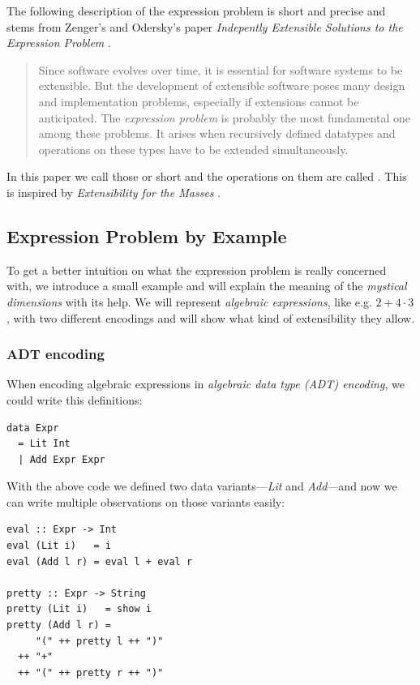 The following description of the expression problem is short and precise and
stems from Zenger’s and Odersky’s paper \emph{Indepently Extensible Solutions to
  the Expression Problem} \cite{indie_solutions}.

\begin{quote}
  Since software evolves over time, it is essential for software systems to be
  extensible. But the development of extensible software poses many design and
  implementation problems, especially if extensions cannot be anticipated. The
  \emph{expression problem} is probably the most fundamental one among these
  problems. It arises when recursively defined datatypes and operations on
  these types have to be extended simultaneously.
\end{quote}

In this paper we call those   or short
 and the operations on them are called . This is
inspired by \emph{Extensibility for the Masses} \cite{object_algebra}.

\subsection{Expression Problem by Example}

To get a better intuition on what the expression problem is really concerned
with, we introduce a small example and will explain the meaning of the
\emph{mystical dimensions} with its help. We will represent \emph{algebraic
  expressions}, like e.g. $2+4 \cdot 3$, with two different encodings and will
show what kind of extensibility they allow.

\subsubsection{ADT encoding}

When encoding algebraic expressions in \emph{algebraic data type (ADT)
  encoding}, we could write this definitions:

\begin{lstlisting}
data Expr
  = Lit Int
  | Add Expr Expr
\end{lstlisting}

With the above code we defined two data variants—\emph{Lit} and \emph{Add}—and
now we can write multiple observations on those variants easily:

\begin{lstlisting} 
eval :: Expr -> Int
eval (Lit i)   = i
eval (Add l r) = eval l + eval r

pretty :: Expr -> String
pretty (Lit i)   = show i
pretty (Add l r) =
     "(" ++ pretty l ++ ")"
  ++ "+"
  ++ "(" ++ pretty r ++ ")"
\end{lstlisting}

